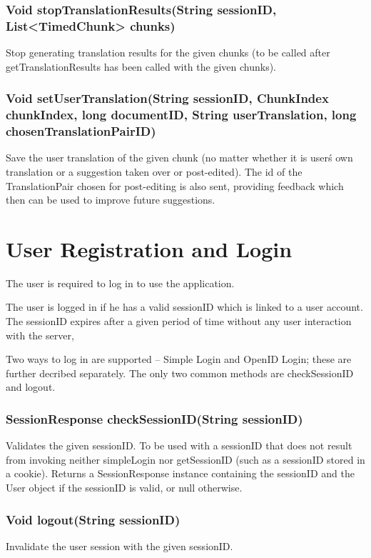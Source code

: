 \subsubsection{Void stopTranslationResults(String sessionID, List<TimedChunk> chunks)}
Stop generating translation results for the given chunks
(to be called after getTranslationResults has been called
with the given chunks).

\subsubsection{Void setUserTranslation(String sessionID, ChunkIndex chunkIndex, long documentID, String userTranslation, long chosenTranslationPairID)}
Save the user translation of the given chunk (no matter whether it is user\'s own translation or a suggestion taken over or post-edited).
The id of the TranslationPair chosen for post-editing is also sent, providing feedback which then can be used to improve future suggestions.

\section{User Registration and Login}

The user is required to log in to use the application.

The user is logged in if he has a valid sessionID which is linked to a user account.
The sessionID expires after a given period of time without any user interaction with the server,

Two ways to log in are supported -- Simple Login and OpenID Login; these are further decribed separately. The only two common methods are checkSessionID and logout.

\subsubsection{SessionResponse checkSessionID(String sessionID)}
Validates the given sessionID. To be used with a sessionID that does not result from invoking neither simpleLogin nor getSessionID (such as a sessionID stored in a cookie).
Returns a SessionResponse instance containing the sessionID and the User object if the sessionID is valid, or null otherwise.

\subsubsection{Void logout(String sessionID)}
Invalidate the user session with the given sessionID.

